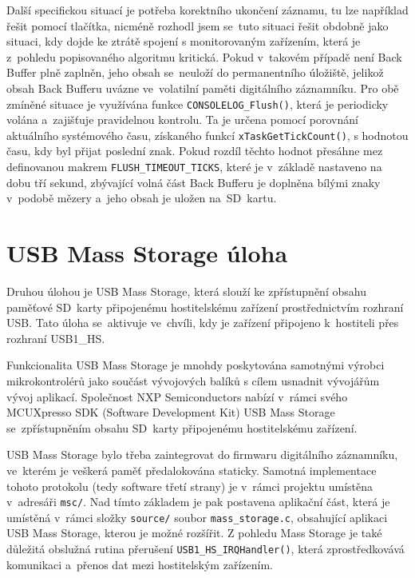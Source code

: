 \newpage

Další specifickou situací je potřeba korektního ukončení záznamu, tu lze například řešit pomocí tlačítka, nicméně rozhodl jsem se~tuto situaci řešit obdobně jako situaci, kdy dojde ke ztrátě spojení s monitorovaným zařízením, která je z~pohledu popisovaného algoritmu kritická. Pokud v~takovém případě není Back Buffer plně zaplněn, jeho obsah se~neuloží do permanentního úložiště,  jelikož obsah Back Bufferu uvázne ve~volatilní paměti digitálního záznamníku. Pro obě zmíněné situace je využívána funkce \texttt{CONSOLELOG\_Flush()}, která je periodicky volána a~zajišťuje pravidelnou kontrolu. Ta je určena pomocí porovnání aktuálního systémového času, získaného funkcí \texttt{xTaskGetTickCount()}, s hodnotou času, kdy byl přijat poslední znak. Pokud rozdíl těchto hodnot přesáhne mez definovanou makrem \texttt{FLUSH\_TIMEOUT\_TICKS}, které je v~základě nastaveno na dobu tří sekund, zbývající volná část Back Bufferu je doplněna bílými znaky v~podobě mězery a~jeho obsah je uložen na~SD~kartu.


\section{USB Mass Storage úloha}
Druhou úlohou je USB Mass Storage, která slouží ke zpřístupnění obsahu paměťové SD~karty připojenému hostitelskému zařízení prostřednictvím rozhraní USB. Tato úloha se~aktivuje ve~chvíli, kdy je zařízení připojeno k~hostiteli přes rozhraní USB1\_HS.


Funkcionalita USB Mass Storage je mnohdy poskytována samotnými výrobci mikrokontrolérů jako součást vývojových balíků s cílem usnadnit vývojářům vývoj aplikací. Společnost NXP Semiconductors nabízí v~rámci svého MCUXpresso SDK (Software Development Kit) USB Mass Storage se~zpřístupněním obsahu SD~karty připojenému hostitelskému zařízení.~\cite{NXP_SDK}

USB Mass Storage bylo třeba zaintegrovat do firmwaru digitálního záznamníku, ve~kterém je veškerá paměť předalokována staticky. Samotná implementace tohoto protokolu (tedy software třetí strany) je v~rámci projektu umístěna v~adresáři \texttt{msc/}. Nad tímto základem je pak postavena aplikační část, která je umístěná v~rámci složky \texttt{source/} soubor \texttt{mass\_storage.c}, obsahující aplikaci USB Mass Storage, kterou je možné rozšířit. Z pohledu Mass Storage je také důležitá obslužná rutina přerušení \texttt{USB1\_HS\_IRQHandler()}, která zprostředkovává komunikaci a~přenos dat mezi hostitelským zařízením.

